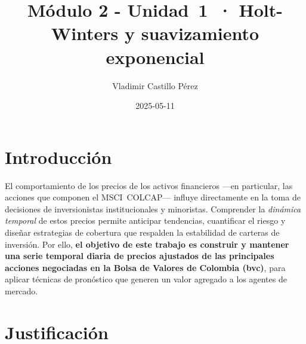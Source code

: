 \documentclass[
  11pt,
]{book}
\title{Módulo 2 - Unidad~1~· Holt-Winters y suavizamiento exponencial}
\author{Vladimir Castillo Pérez}
\date{2025-05-11}
\begin{document}
\maketitle

{
\setcounter{tocdepth}{1}
\tableofcontents
}
\chapter{Introducción}\label{introducciuxf3n}

El comportamiento de los precios de los activos financieros ---en particular, las acciones que componen el MSCI~COLCAP--- influye directamente en la toma de decisiones de inversionistas institucionales y minoristas. Comprender la \emph{dinámica temporal} de estos precios permite anticipar tendencias, cuantificar el riesgo y diseñar estrategias de cobertura que respalden la estabilidad de carteras de inversión. Por ello, \textbf{el objetivo de este trabajo es construir y mantener una serie temporal diaria de precios ajustados de las principales acciones negociadas en la Bolsa de Valores de Colombia (bvc)}, para aplicar técnicas de pronóstico que generen un valor agregado a los agentes de mercado.

\chapter{Justificación}\label{justificaciuxf3n}
\end{document}
